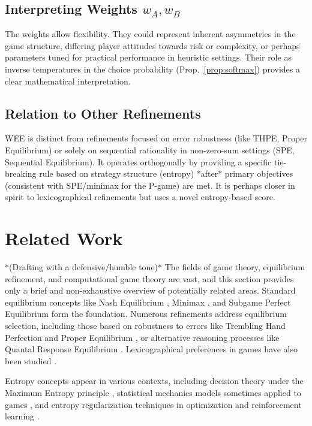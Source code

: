 \documentclass{article}
\begin{document}
\subsection{Interpreting Weights \texorpdfstring{$w_A, w_B$}{wA, wB}}
The weights allow flexibility. They could represent inherent asymmetries in the game structure, differing player attitudes towards risk or complexity, or perhaps parameters tuned for practical performance in heuristic settings. Their role as inverse temperatures in the choice probability (Prop.~\ref{prop:softmax}) provides a clear mathematical interpretation.

\subsection{Relation to Other Refinements}
WEE is distinct from refinements focused on error robustness (like THPE, Proper Equilibrium) or solely on sequential rationality in non-zero-sum settings (SPE, Sequential Equilibrium). It operates orthogonally by providing a specific tie-breaking rule based on strategy structure (entropy) *after* primary objectives (consistent with SPE/minimax for the P-game) are met. It is perhaps closer in spirit to lexicographical refinements but uses a novel entropy-based score.

\section{Related Work}
*(Drafting with a defensive/humble tone)*
The fields of game theory, equilibrium refinement, and computational game theory are vast, and this section provides only a brief and non-exhaustive overview of potentially related areas. Standard equilibrium concepts like Nash Equilibrium \cite{placeholder_nash}, Minimax \cite{placeholder_vonneumann}, and Subgame Perfect Equilibrium \cite{placeholder_selten_spe} form the foundation. Numerous refinements address equilibrium selection, including those based on robustness to errors like Trembling Hand Perfection \cite{placeholder_selten_thpe} and Proper Equilibrium \cite{placeholder_myerson}, or alternative reasoning processes like Quantal Response Equilibrium \cite{placeholder_qre}. Lexicographical preferences in games have also been studied \cite{placeholder_lexico_games}.

Entropy concepts appear in various contexts, including decision theory under the Maximum Entropy principle \cite{placeholder_jaynes}, statistical mechanics models sometimes applied to games \cite{placeholder_statphys_games}, and entropy regularization techniques in optimization and reinforcement learning \cite{placeholder_entropy_rl}.
\end{document}
